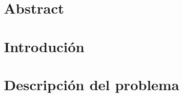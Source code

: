 \documentclass{article}
\begin{document}
    

    \tableofcontents
    \listoffigures
    \listoftables
    \newpage

    \section*{Abstract}
        
    
    \section{Introdución}
        
    
    \section{Descripción del problema}
        
\end{document}

